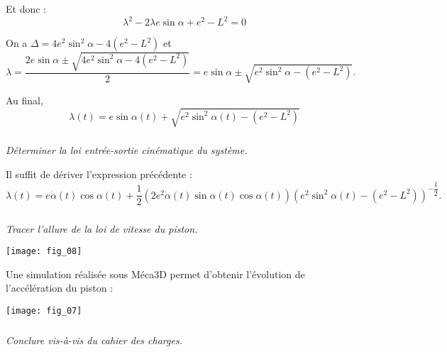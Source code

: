 \begin{multicols}{2}
\begin{corrige}
Et donc :
$$
 \lambda^2 -2\lambda e \sin\alpha+e^2-L^2=0
$$


On a $\Delta = 4e^2\sin^2\alpha - 4\left(e^2 - L^2 \right)$ et 
$\lambda 
= \dfrac{2 e \sin\alpha\pm \sqrt{4e^2\sin^2\alpha - 4\left(e^2 - L^2 \right)}}{2}
=  e \sin\alpha\pm \sqrt{e^2\sin^2\alpha - \left(e^2 - L^2 \right)}$.

Au final, 
$$\lambda(t)=  e \sin\alpha(t)+ \sqrt{e^2\sin^2\alpha(t) - \left(e^2 - L^2 \right)}$$



\end{corrige}
\else
\fi
\subparagraph{}\textit{Déterminer la loi entrée-sortie cinématique du système.}
\ifprof
\begin{corrige}
Il suffit de dériver l'expression précédente :
$$\lambda(t)=  e \dot{\alpha}(t)\cos\alpha(t)+ \dfrac{1}{2}\left(2e^2\dot{\alpha}(t)\sin\alpha(t)\cos\alpha(t) \right)\left(e^2\sin^2\alpha(t) - \left(e^2 - L^2 \right)\right)^{-\dfrac{1}{2}}.$$
\end{corrige}
\else
\fi

\subparagraph{}\textit{Tracer l'allure de la loi de vitesse du piston.}
\ifprof
\begin{corrige}
\begin{center}
\texttt{[image: fig\_08]}
\end{center}
\end{corrige}
\else
\fi


Une simulation réalisée sous Méca3D permet d'obtenir l'évolution de l'accélération du piston : 

\begin{center}
\texttt{[image: fig\_07]}
\end{center}


\subparagraph{}\textit{Conclure vis-à-vis du cahier des charges.}


\ifprof
\else
\end{multicols}
\fi


